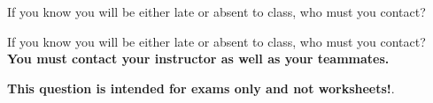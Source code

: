 

If you know you will be either late or absent to class, who must you contact?







If you know you will be either late or absent to class, who must you contact? {\bf You must contact your instructor as well as your teammates.}







{\bf This question is intended for exams only and not worksheets!}.




